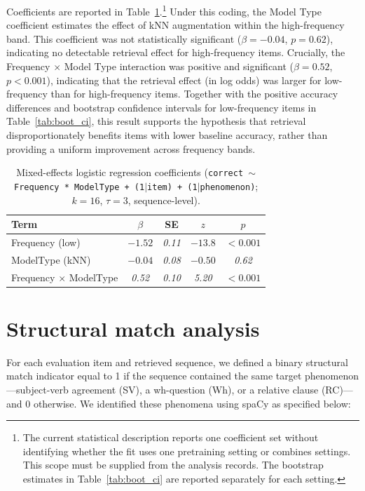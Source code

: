 Coefficients are reported in Table~\ref{tab:mixed_effects}.\footnote{The current statistical description reports one coefficient set without identifying whether the fit uses one pretraining setting or combines settings. This scope must be supplied from the analysis records. The bootstrap estimates in Table~\ref{tab:boot_ci} are reported separately for each setting.} Under this coding, the Model Type coefficient estimates the effect of kNN augmentation within the high-frequency band. This coefficient was not statistically significant ($\beta=-0.04$, $p=0.62$), indicating no detectable retrieval effect for high-frequency items. Crucially, the Frequency $\times$ Model Type interaction was positive and significant ($\beta=0.52$, $p<0.001$), indicating that the retrieval effect (in log odds) was larger for low-frequency than for high-frequency items. Together with the positive accuracy differences and bootstrap confidence intervals for low-frequency items in Table~\ref{tab:boot_ci}, this result supports the hypothesis that retrieval disproportionately benefits items with lower baseline accuracy, rather than providing a uniform improvement across frequency bands.


\begin{table}[ht]
\centering
\small
\caption{Mixed-effects logistic regression coefficients
(\texttt{correct $\sim$ Frequency * ModelType + (1$\mid$item) + (1$\mid$phenomenon)}; $k=16$, $\tau=3$, sequence-level).}
\label{tab:mixed_effects}
\begin{tabular}{lcccc}
\toprule
Term & $\beta$ & SE & $z$ & $p$ \\
\midrule
Frequency (low)                    & \textit{$-1.52$} & \textit{0.11} & \textit{$-13.8$} & \textit{$<0.001$} \\
ModelType (kNN)                    & \textit{$-0.04$} & \textit{0.08} & \textit{$-0.50$}  & \textit{0.62} \\
Frequency $\times$ ModelType       & \textit{0.52}    & \textit{0.10} & \textit{5.20}    & \textit{$<0.001$} \\
\bottomrule
\end{tabular}
\end{table}



\section{Structural match analysis}
\label{app:struc_simi}

For each evaluation item and retrieved sequence, we defined a binary
structural match indicator equal to 1 if the sequence contained the same target phenomenon---subject-verb agreement (SV), a wh-question (Wh), or a relative clause (RC)---and 0 otherwise. We identified these phenomena using spaCy \citep{honnibal2020spacy} as specified below:

